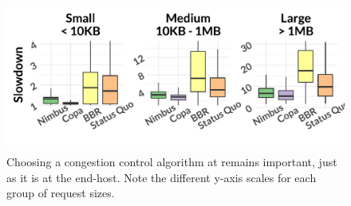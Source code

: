 \begin{figure}
    \centering
\begin{knitrout}
\color{fgcolor}
\includegraphics[width=\maxwidth]{figure/eval_cc-1} 

\end{knitrout}
    \caption{Choosing a congestion control algorithm at \name remains important, just as it is at the end-host. Note the different y-axis scales for each group of request sizes.}
    \label{fig:eval:cc}
\end{figure}
\newcommand{\ccCopaMedian}{1.09\xspace}
\newcommand{\ccNimbusMedian}{1.32\xspace}
\newcommand{\ccBBRMedian}{1.91\xspace}
\newcommand{\ccBaselineMedian}{1.76\xspace}
